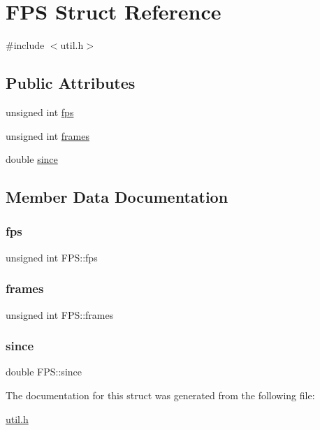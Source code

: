 \hypertarget{structFPS}{}\section{F\+PS Struct Reference}
\label{structFPS}


{\ttfamily \#include $<$util.\+h$>$}

\subsection*{Public Attributes}
\begin{DoxyCompactItemize}
\item 
unsigned int \hyperlink{structFPS_ac960f6d060a8c1b0aa94b51ac695a75d}{fps}
\item 
unsigned int \hyperlink{structFPS_acc427eae0a41ee5d36a4c9bdb5149393}{frames}
\item 
double \hyperlink{structFPS_a00ae9e9c14b85585e20122a32e35000d}{since}
\end{DoxyCompactItemize}


\subsection{Member Data Documentation}
\mbox{\label{structFPS_ac960f6d060a8c1b0aa94b51ac695a75d}} 
\subsubsection{\texorpdfstring{fps}{fps}}
{\footnotesize\ttfamily unsigned int F\+P\+S\+::fps}

\mbox{\label{structFPS_acc427eae0a41ee5d36a4c9bdb5149393}} 
\subsubsection{\texorpdfstring{frames}{frames}}
{\footnotesize\ttfamily unsigned int F\+P\+S\+::frames}

\mbox{\label{structFPS_a00ae9e9c14b85585e20122a32e35000d}} 
\subsubsection{\texorpdfstring{since}{since}}
{\footnotesize\ttfamily double F\+P\+S\+::since}



The documentation for this struct was generated from the following file\+:\begin{DoxyCompactItemize}
\item 
\hyperlink{util_8h}{util.\+h}\end{DoxyCompactItemize}
